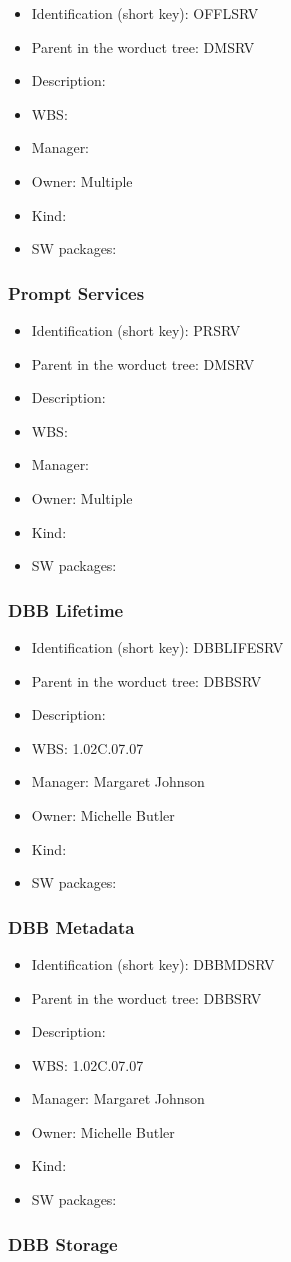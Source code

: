 \begin{itemize}\item Identification (short key): OFFLSRV
\item Parent in the worduct tree: DMSRV
\item Description: 
\item WBS: 
\item Manager: 
\item Owner: Multiple
\item Kind:
\item SW packages: 
\end{itemize}\subsubsection{Prompt Services}
\begin{itemize}\item Identification (short key): PRSRV
\item Parent in the worduct tree: DMSRV
\item Description: 
\item WBS: 
\item Manager: 
\item Owner: Multiple
\item Kind:
\item SW packages: 
\end{itemize}\subsubsection{DBB Lifetime}
\begin{itemize}\item Identification (short key): DBBLIFESRV
\item Parent in the worduct tree: DBBSRV
\item Description: 
\item WBS: 1.02C.07.07
\item Manager: Margaret Johnson
\item Owner: Michelle Butler
\item Kind:
\item SW packages: 
\end{itemize}\subsubsection{DBB Metadata}
\begin{itemize}\item Identification (short key): DBBMDSRV
\item Parent in the worduct tree: DBBSRV
\item Description: 
\item WBS: 1.02C.07.07
\item Manager: Margaret Johnson
\item Owner: Michelle Butler
\item Kind:
\item SW packages: 
\end{itemize}\subsubsection{DBB Storage}
